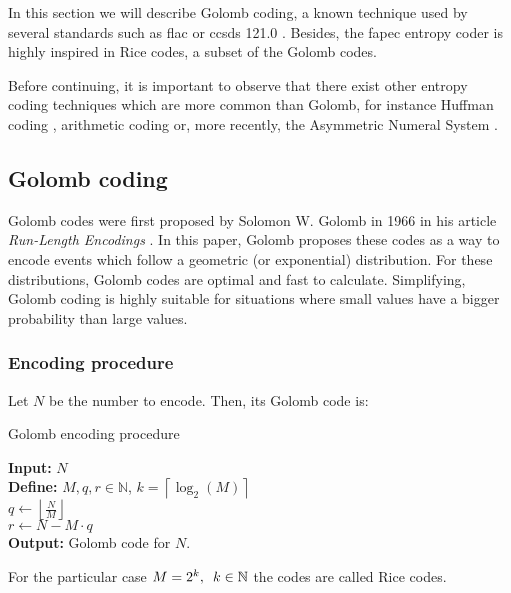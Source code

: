 In this section we will describe Golomb coding, a known technique used by several standards such as \acrshort{flac} \parencite{FLAC} or \acrshort{ccsds} 121.0 \parencite{ccsds121}. Besides, the \acrshort{fapec} entropy coder is highly inspired in Rice codes, a subset of the Golomb codes.

Before continuing, it is important to observe that there exist other entropy coding techniques which are more common than Golomb, for instance Huffman coding \parencite{cover}, arithmetic coding \parencite{MacKay} or, more recently, the Asymmetric Numeral System \parencite{ans}.

\subsection{Golomb coding} \label{golomb-coding}
Golomb codes were first proposed by Solomon W. Golomb in 1966 in his article \textit{Run-Length Encodings} \parencite{Golomb1966}. In this paper, Golomb proposes these codes as a way to encode events which follow a geometric (or exponential) distribution. For these distributions, Golomb codes are optimal \parencite{OptimalRice} \parencite{OptimalGeometric} and fast to calculate. Simplifying, Golomb coding is highly suitable for situations where small values have a bigger probability than large values.

\subsubsection{Encoding procedure}
Let $N$ be the number to encode. Then, its Golomb code is:

\begin{algorithm}[H]
	\caption{Golomb encoding procedure}
	\SetAlgoLined
	\textbf{Input:} $N$\\
	\textbf{Define:} $M,q,r \in \mathbb{N}$, \quad $k = \left\lceil \log_2(M) \right\rceil$\\
	$q \gets \left\lfloor \frac{N}{M} \right\rfloor$\\
	$r \gets N - M \cdot q$\\
	\textbf{Output:} Golomb code for $N$.
\end{algorithm}

For the particular case $M=2^k,\hspace{0.5em} k \in \mathbb{N}$ the codes are called Rice codes.

